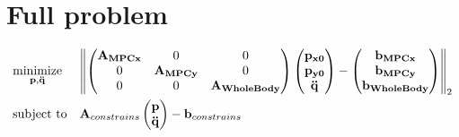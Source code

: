 \documentclass[10pt,a4paper]{article}
\begin{document}
\section*{Full problem}
\begin{equation*}
\begin{aligned}
& \underset{\bold{p},\bold{\ddot{q}}}{\text{minimize}}
& & \norm{
	\begin{pmatrix} 
         \bold{A_{MPC x}}     & 0 	 & 0\\
         0         & \bold{A_{MPC y}} & 0 \\
         0         & 0 &  \bold{A_{WholeBody}}
        \end{pmatrix}
	\begin{pmatrix} 
        \bold{p_{x0}} \\
        \bold{p_{y0}} \\
        \bold{\ddot{q}
        }
	\end{pmatrix}
	- \begin{pmatrix} 
        \bold{b_{MPC x}}\\
        \bold{b_{MPC y}}\\
        \bold{b_{WholeBody}}
	\end{pmatrix}	
}_2 \\
& \text{subject to}
& & {\bold{A}_{constrains}\begin{pmatrix} 
        \bold{p} \\
        \bold{\ddot{q}}
	\end{pmatrix}- \bold{b}_{constrains}} 	
\end{aligned}
\end{equation*}
\end{document}
